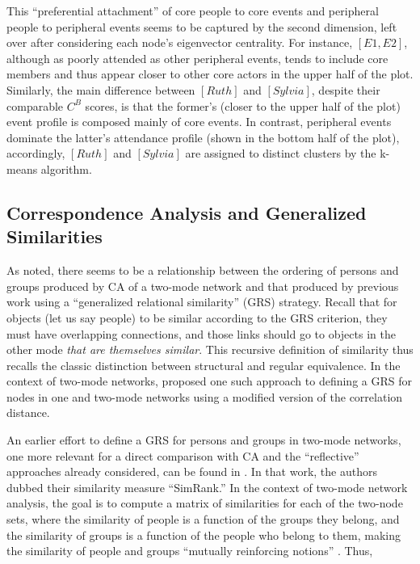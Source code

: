 \documentclass[a4paper,fleqn]{cas-sc}
\begin{document}
This ``preferential attachment'' \citep{barabasi1999emergence} of core people to core events and peripheral people to peripheral events seems to be captured by the second dimension, left over after considering each node's eigenvector centrality. For instance, $\left[E1, E2\right]$, although as poorly attended as other peripheral events, tends to include core members and thus appear closer to other core actors in the upper half of the plot. Similarly, the main difference between $\left[Ruth\right]$ and $\left[Sylvia\right]$, despite their comparable $C^B$ scores, is that the former's (closer to the upper half of the plot) event profile is composed mainly of core events. In contrast, peripheral events dominate the latter's attendance profile (shown in the bottom half of the plot), accordingly, $\left[Ruth\right]$ and $\left[Sylvia\right]$ are assigned to distinct clusters by the k-means algorithm. 

\subsection{Correspondence Analysis and Generalized Similarities}
As noted, there seems to be a relationship between the ordering of persons and groups produced by CA of a two-mode network and that produced by previous work using a ``generalized relational similarity'' (GRS) strategy. Recall that for objects (let us say people) to be similar according to the GRS criterion, they must have overlapping connections, and those links should go to objects in the other mode \textit{that are themselves similar}. This recursive definition of similarity thus recalls the classic distinction between structural and regular equivalence. In the context of two-mode networks, \citet{kovacs2010generalized} proposed one such approach to defining a GRS for nodes in one and two-mode networks using a modified version of the correlation distance.

An earlier effort to define a GRS for persons and groups in two-mode networks, one more relevant for a direct comparison with CA and the ``reflective'' approaches already considered, can be found in \citet{jeh2002simrank}. In that work, the authors dubbed their similarity measure ``SimRank.'' In the context of two-mode network analysis, the goal is to compute a matrix of similarities for each of the two-node sets, where the similarity of people is a function of the groups they belong, and the similarity of groups is a function of the people who belong to them, making the similarity of people and groups ``mutually reinforcing notions'' \citep[540]{jeh2002simrank}. Thus,
\end{document}
